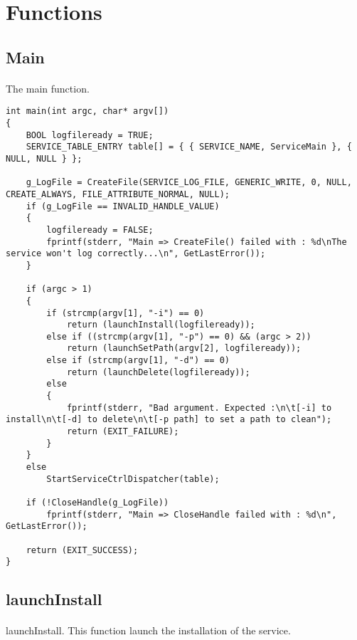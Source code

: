 \documentclass{article}
\begin{document}
\newpage
\section{Functions}
\subsection{Main}
\paragraph{}
The main function.

\begin{lstlisting}
int	main(int argc, char* argv[])
{
	BOOL logfileready = TRUE;
	SERVICE_TABLE_ENTRY table[] = { { SERVICE_NAME, ServiceMain }, { NULL, NULL } };

	g_LogFile = CreateFile(SERVICE_LOG_FILE, GENERIC_WRITE, 0, NULL, CREATE_ALWAYS, FILE_ATTRIBUTE_NORMAL, NULL);
	if (g_LogFile == INVALID_HANDLE_VALUE)
	{
		logfileready = FALSE;
		fprintf(stderr, "Main => CreateFile() failed with : %d\nThe service won't log correctly...\n", GetLastError());
	}

	if (argc > 1)
	{
		if (strcmp(argv[1], "-i") == 0)
			return (launchInstall(logfileready));
		else if ((strcmp(argv[1], "-p") == 0) && (argc > 2))
			return (launchSetPath(argv[2], logfileready));
		else if (strcmp(argv[1], "-d") == 0)
			return (launchDelete(logfileready));
		else
		{
			fprintf(stderr, "Bad argument. Expected :\n\t[-i] to install\n\t[-d] to delete\n\t[-p path] to set a path to clean");
			return (EXIT_FAILURE);
		}
	}
	else
		StartServiceCtrlDispatcher(table);

	if (!CloseHandle(g_LogFile))
		fprintf(stderr, "Main => CloseHandle failed with : %d\n", GetLastError());

	return (EXIT_SUCCESS);
}

\end{lstlisting}




\newpage
\subsection{launchInstall}
\paragraph{}
launchInstall. This function launch the installation of the service.
\end{document}

